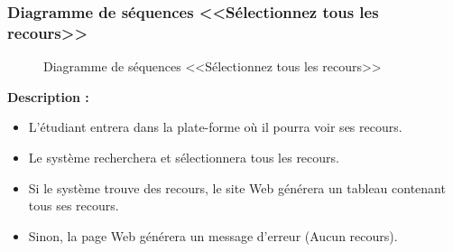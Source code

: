 \documentclass[12pt]{report}
\begin{document}
\newpage

\subsubsection{Diagramme de séquences <<Sélectionnez tous les recours>>}

\begin{figure}[h]
\centering
    \centerline{}
    \caption{Diagramme de séquences <<Sélectionnez tous les recours>>}
\end{figure}

\vspace{0.3in}

\textbf{Description :}

\begin{itemize}
    \item L'étudiant entrera dans la plate-forme où il pourra voir ses recours.
    \item Le système recherchera et sélectionnera tous les recours. 
    \item Si le système trouve des recours, le site Web générera un tableau contenant tous ses recours.
    \item Sinon, la page Web générera un message d'erreur (Aucun recours).
\end{itemize}
\end{document}
